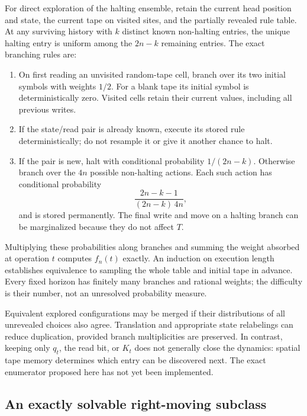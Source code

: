 \documentclass{article}
\begin{document}
For direct exploration of the halting ensemble, retain the current head
position and state, the current tape on visited sites, and the partially
revealed rule table.  At any surviving history with $k$ distinct known
non-halting entries, the unique halting entry is uniform among the
$2n-k$ remaining entries.  The exact branching rules are:
\begin{enumerate}
\item On first reading an unvisited random-tape cell, branch over its
two initial symbols with weights $1/2$.  For a blank tape its initial
symbol is deterministically zero.  Visited cells retain their current
values, including all previous writes.
\item If the state/read pair is already known, execute its stored rule
deterministically; do not resample it or give it another chance to halt.
\item If the pair is new, halt with conditional probability $1/(2n-k)$.
Otherwise branch over the $4n$ possible non-halting actions.  Each such
action has conditional probability
\begin{equation}
\frac{2n-k-1}{(2n-k)\,4n},
\end{equation}
and is stored permanently.  The final write and move on a halting branch
can be marginalized because they do not affect $T$.
\end{enumerate}
Multiplying these probabilities along branches and summing the weight
absorbed at operation $t$ computes $f_n(t)$ exactly.  An induction on
execution length establishes equivalence to sampling the whole table
and initial tape in advance.  Every fixed horizon has finitely many
branches and rational weights; the difficulty is their number, not an
unresolved probability measure.

Equivalent explored configurations may be merged if their distributions
of all unrevealed choices also agree.  Translation and appropriate state
relabelings can reduce duplication, provided branch multiplicities are
preserved.  In contrast, keeping only $q_t$, the read bit, or $K_t$ does
not generally close the dynamics: spatial tape memory determines which
entry can be discovered next.  The exact enumerator proposed here has
not yet been implemented.

\subsection{An exactly solvable right-moving subclass}
\end{document}

